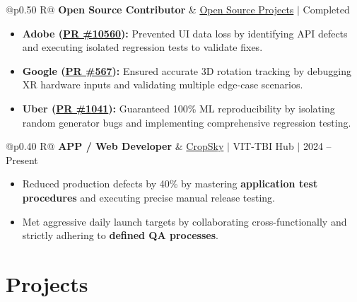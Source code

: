 \documentclass[a4paper,10pt]{article}
\newcommand{\ulink}[2]{\href{#1}{#2}}
\newcommand{\subheading}[1]{{\color[HTML]{0A0A0A}\fontsize{12}{14}\selectfont\bfseries #1}}
\newcommand{\meta}[1]{{\color[HTML]{5C5C5C}\fontsize{10.5}{12.5}\selectfont #1}}
\begin{document}
\begin{tabularx}{\linewidth}{@{}p{0.50\linewidth} R@{}}
\subheading{Open Source Contributor} & \meta{\ulink{https://github.com/su-jin1425/My-Open-Source-Contributions}{Open Source Projects} $|$ Completed}
\end{tabularx}
\begin{itemize}[nosep, leftmargin=1.5em, itemsep=2pt, topsep=2pt]
  \item {\color[HTML]{0A0A0A}\fontsize{11}{14}\selectfont \textbf{Adobe (\ulink{https://github.com/adobe/react-spectrum/pull/10560}{PR \#10560}):} Prevented UI data loss by identifying API defects and executing isolated regression tests to validate fixes.}
  \item {\color[HTML]{0A0A0A}\fontsize{11}{14}\selectfont \textbf{Google (\ulink{https://github.com/google/xrblocks/pull/567}{PR \#567}):} Ensured accurate 3D rotation tracking by debugging XR hardware inputs and validating multiple edge-case scenarios.}
  \item {\color[HTML]{0A0A0A}\fontsize{11}{14}\selectfont \textbf{Uber (\ulink{https://github.com/uber/causalml/pull/1041}{PR \#1041}):} Guaranteed 100\% ML reproducibility by isolating random generator bugs and implementing comprehensive regression testing.}
\end{itemize}

\begin{tabularx}{\linewidth}{@{}p{0.40\linewidth} R@{}}
\subheading{APP / Web Developer} & \meta{\ulink{https://sites.google.com/view/cropsky/home}{CropSky} $|$ VIT-TBI Hub $|$ 2024 -- Present}
\end{tabularx}
\begin{itemize}[nosep, leftmargin=1.5em, itemsep=2pt, topsep=2pt]
  \item {\color[HTML]{0A0A0A}\fontsize{11}{14}\selectfont Reduced production defects by 40\% by mastering \textbf{application test procedures} and executing precise manual release testing.}
  \item {\color[HTML]{0A0A0A}\fontsize{11}{14}\selectfont Met aggressive daily launch targets by collaborating cross-functionally and strictly adhering to \textbf{defined QA processes}.}
\end{itemize}

\section{Projects}
\vspace{2pt}
\end{document}

